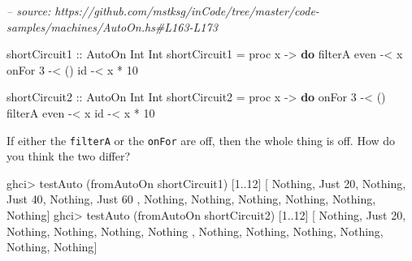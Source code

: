 \documentclass[]{article}
\newenvironment{Shaded}{}{}
\newcommand{\CommentTok}[1]{\textcolor[rgb]{0.38,0.63,0.69}{\textit{#1}}}
\newcommand{\DataTypeTok}[1]{\textcolor[rgb]{0.56,0.13,0.00}{#1}}
\newcommand{\DecValTok}[1]{\textcolor[rgb]{0.25,0.63,0.44}{#1}}
\newcommand{\FunctionTok}[1]{\textcolor[rgb]{0.02,0.16,0.49}{#1}}
\newcommand{\KeywordTok}[1]{\textcolor[rgb]{0.00,0.44,0.13}{\textbf{#1}}}
\newcommand{\NormalTok}[1]{#1}
\newcommand{\OtherTok}[1]{\textcolor[rgb]{0.00,0.44,0.13}{#1}}
\begin{document}
\begin{Shaded}
\begin{Highlighting}[]
\CommentTok{-- source: https://github.com/mstksg/inCode/tree/master/code-samples/machines/AutoOn.hs#L163-L173}

\OtherTok{shortCircuit1 ::} \DataTypeTok{AutoOn} \DataTypeTok{Int} \DataTypeTok{Int}
\NormalTok{shortCircuit1 }\FunctionTok{=}\NormalTok{ proc x }\OtherTok{->} \KeywordTok{do}
\NormalTok{    filterA even }\FunctionTok{-<}\NormalTok{ x}
\NormalTok{    onFor }\DecValTok{3}      \FunctionTok{-<}\NormalTok{ ()}
\NormalTok{    id           }\FunctionTok{-<}\NormalTok{ x }\FunctionTok{*} \DecValTok{10}

\OtherTok{shortCircuit2 ::} \DataTypeTok{AutoOn} \DataTypeTok{Int} \DataTypeTok{Int}
\NormalTok{shortCircuit2 }\FunctionTok{=}\NormalTok{ proc x }\OtherTok{->} \KeywordTok{do}
\NormalTok{    onFor }\DecValTok{3}      \FunctionTok{-<}\NormalTok{ ()}
\NormalTok{    filterA even }\FunctionTok{-<}\NormalTok{ x}
\NormalTok{    id           }\FunctionTok{-<}\NormalTok{ x }\FunctionTok{*} \DecValTok{10}
\end{Highlighting}
\end{Shaded}

If either the \texttt{filterA} or the \texttt{onFor} are off, then the whole
thing is off. How do you think the two differ?

\begin{Shaded}
\begin{Highlighting}[]
\NormalTok{ghci}\FunctionTok{>}\NormalTok{ testAuto (fromAutoOn shortCircuit1) [}\DecValTok{1}\FunctionTok{..}\DecValTok{12}\NormalTok{]}
\NormalTok{[ }\DataTypeTok{Nothing}\NormalTok{, }\DataTypeTok{Just} \DecValTok{20}\NormalTok{, }\DataTypeTok{Nothing}\NormalTok{, }\DataTypeTok{Just} \DecValTok{40}\NormalTok{, }\DataTypeTok{Nothing}\NormalTok{, }\DataTypeTok{Just} \DecValTok{60}
\NormalTok{, }\DataTypeTok{Nothing}\NormalTok{, }\DataTypeTok{Nothing}\NormalTok{, }\DataTypeTok{Nothing}\NormalTok{, }\DataTypeTok{Nothing}\NormalTok{, }\DataTypeTok{Nothing}\NormalTok{, }\DataTypeTok{Nothing}\NormalTok{]}
\NormalTok{ghci}\FunctionTok{>}\NormalTok{ testAuto (fromAutoOn shortCircuit2) [}\DecValTok{1}\FunctionTok{..}\DecValTok{12}\NormalTok{]}
\NormalTok{[ }\DataTypeTok{Nothing}\NormalTok{, }\DataTypeTok{Just} \DecValTok{20}\NormalTok{, }\DataTypeTok{Nothing}\NormalTok{, }\DataTypeTok{Nothing}\NormalTok{, }\DataTypeTok{Nothing}\NormalTok{, }\DataTypeTok{Nothing}
\NormalTok{, }\DataTypeTok{Nothing}\NormalTok{, }\DataTypeTok{Nothing}\NormalTok{, }\DataTypeTok{Nothing}\NormalTok{, }\DataTypeTok{Nothing}\NormalTok{, }\DataTypeTok{Nothing}\NormalTok{, }\DataTypeTok{Nothing}\NormalTok{]}
\end{Highlighting}
\end{Shaded}
\end{document}
